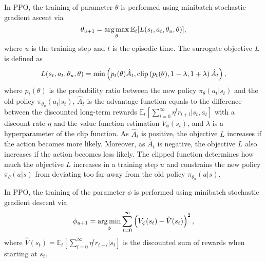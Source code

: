 In PPO, the training of parameter $\theta$ is performed using minibatch stochastic gradient ascent via
\begin{equation*}
  \theta_{u+1} = \operatorname*{arg\,max}_\theta {\mathbb{E}}_t [L(s_t,a_t,\theta_u,\theta)],
\end{equation*}
where $u$ is the training step and $t$ is the episodic time. The surrogate objective $L$ is defined as
\begin{equation*}
  L(s_t,a_t,\theta_u,\theta) = \operatorname*{min} \left( p_t(\theta) \hat{A}_t, \text{clip} \left(p_t(\theta),1-\lambda,1+\lambda\right) \hat{A}_t \right),
\end{equation*}
where $p_t(\theta)$ is the probability ratio between the new policy $\pi_\theta(a_t|s_t)$ and the old policy $\pi_{\theta_u}(a_t|s_t)$, $\hat{A}_t$ is the advantage function equals to the difference between the discounted long-term rewards $\mathbb{E}_t \left[\sum_{l=0}^\infty \eta^l r_{t+l}|s_t,a_t \right]$ with a discount rate $\eta$ and the value function estimation $V_\phi(s_t)$, and $\lambda$ is a hyperparameter of the clip function. As $\hat{A}_t$ is positive, the objective $L$ increases if the action becomes more likely. Moreover, as $\hat{A}_t$ is negative, the objective $L$ also increases if the action becomes less likely. The clipped function determines how much the objective $L$ increases in a training step $u$ and constrains the new policy $\pi_\theta(a|s)$ from deviating too far away from the old policy $\pi_{\theta_u}(a|s)$.

In PPO, the training of the parameter $\phi$ is performed using minibatch stochastic gradient descent via
\begin{equation*}
  \phi_{u+1} = \operatorname*{arg\,min}_\phi \sum_{t=0}^\infty \left(V_\phi(s_t)-\hat{V}(s_t) \right)^2,
\end{equation*}
where $\hat{V}(s_t) {=} \mathbb{E}_t \left[\sum_{l=0}^\infty \eta^l r_{t+l}|s_t \right]$ is the discounted sum of rewards when starting at $s_t$. 

